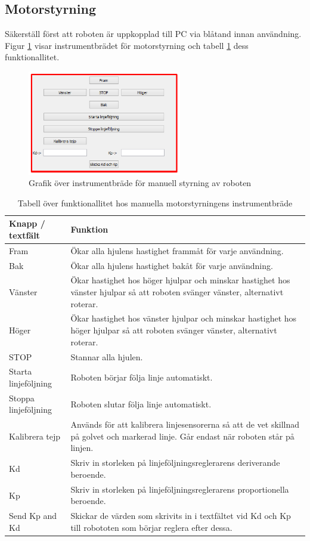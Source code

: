 \documentclass[a4paper,12pt]{article}
\begin{document}
\subsection{Motorstyrning}
\label{subsec:motor}
Säkerställ först att roboten är uppkopplad till PC via blåtand innan användning. Figur \ref{fig:pc_motor} visar instrumentbrädet för motorstyrning och tabell \ref{tab:motor} dess funktionallitet.

\begin{figure}[H]
	\centering
	\includegraphics[width=0.6\textwidth]{man_motor1.pdf}
	\caption{Grafik över instrumentbräde för manuell styrning av roboten}
	\label{fig:pc_motor}
\end{figure}

\begin{table}[H]
\centering
\begin{tabularx}{\textwidth}{|l|X|}
\hline \textbf{Knapp / textfält} & \textbf{Funktion} \\ \hline
Fram & Ökar alla hjulens hastighet frammåt för varje användning. \\ \hline
Bak & Ökar alla hjulens hastighet bakåt för varje användning. \\ \hline
Vänster & Ökar hastighet hos höger hjulpar och minskar hastighet hos vänster hjulpar så att roboten svänger vänster, alternativt roterar. \\ \hline
Höger & Ökar hastighet hos vänster hjulpar och minskar hastighet hos höger hjulpar så att roboten svänger vänster, alternativt roterar. \\ \hline
STOP & Stannar alla hjulen. \\ \hline
Starta linjeföljning & Roboten börjar följa linje automatiskt. \\ \hline
Stoppa linjeföljning & Roboten slutar följa linje automatiskt. \\ \hline
Kalibrera tejp & Används för att kalibrera linjesensorerna så att de vet skillnad på golvet och markerad linje. Går endast när roboten står på linjen. \\ \hline
Kd & Skriv in storleken på linjeföljningsreglerarens deriverande beroende. \\ \hline
Kp & Skriv in storleken på linjeföljningsreglerarens proportionella beroende. \\ \hline
Send Kp and Kd & Skickar de värden som skrivits in i textfältet vid Kd och Kp till robototen som börjar reglera efter dessa. \\ \hline

\end{tabularx}
\caption{Tabell över funktionallitet hos manuella motorstyrningens instrumentbräde}
\label{tab:motor}
\end{table}
\end{document}
